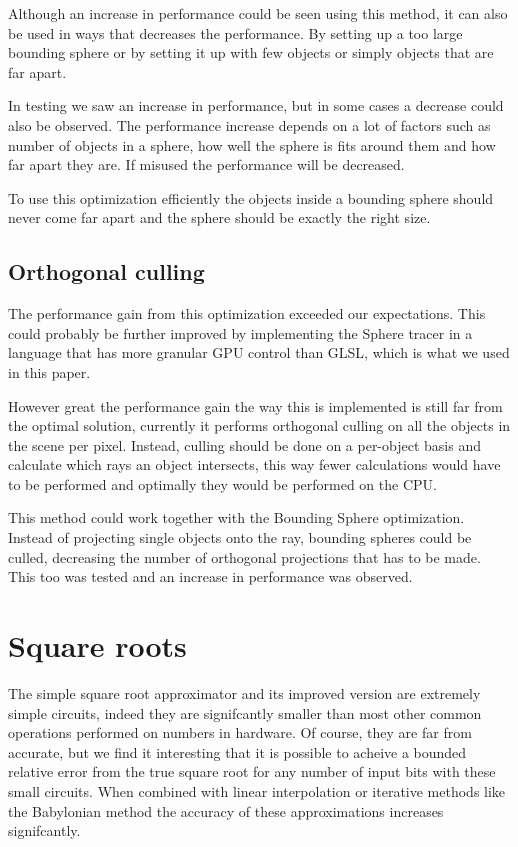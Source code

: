 			Although an increase in performance could be seen using this
			method, it can also be used in ways that decreases the performance.
			By setting up a too large bounding sphere or by setting it up with
			few objects or simply objects that are far apart.

			In testing we saw an increase in performance, but in some cases a
			decrease could also be observed. The performance increase depends
			on a lot of factors such as number of objects in a sphere, how well
			the sphere is fits around them and how far apart they are. If
			misused the performance will be decreased.

			To use this optimization efficiently the objects inside a bounding
			sphere should never come far apart and the sphere should be exactly
			the right size.

		\subsection{Orthogonal culling}

			The performance gain from this optimization exceeded our 
			expectations. This could probably be further improved by 
			implementing the Sphere tracer in a language that has more granular 
			GPU control than GLSL, which is what we used in this paper.

			However great the performance gain the way this is implemented 
			is still far from the optimal solution, currently it performs 
			orthogonal culling on all the objects in the scene per pixel. 
			Instead, culling should be done on a per-object basis and calculate 
			which rays an object intersects, this way fewer calculations would
			have to be performed and optimally they would be performed on the
			CPU.

			This method could work together with the Bounding Sphere
			optimization. Instead of projecting single objects onto the ray,
			bounding spheres could be culled, decreasing the number of
			orthogonal projections that has to be made. This too was tested and
			an increase in performance was observed.

	\section{Square roots}

		The simple square root approximator and its improved version are
		extremely simple circuits, indeed they are signifcantly smaller than
		most other common operations performed on numbers in hardware. Of
		course, they are far from accurate, but we find it interesting that it
		is possible to acheive a bounded relative error from the true square
		root for any number of input bits with these small circuits. When
		combined with linear interpolation or iterative methods like the
		Babylonian method the accuracy of these approximations increases
		signifcantly.
		
